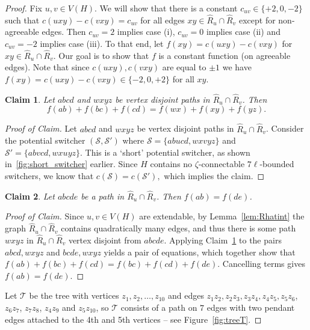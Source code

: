 \documentclass[A4paper,12pt]{article}
\newtheorem{claim}{Claim}[thm]
\theoremstyle{definition}
\newcommand*{\claimproofname}{Proof of Claim}
\newenvironment{claimproof}[1][\claimproofname]{\begin{proof}[#1]\renewcommand*{\qedsymbol}{\(\square\)}}{\end{proof}}
\begin{document}
\begin{proof}
    Fix $u,v \in V(H)$. We will show that there is a constant $c_{uv} \in \{+2,0,-2\}$  such that  $c(uxy) - c(vxy) = c_{uv}$ for all edges $xy\in\hat{R}_u \cap \hat{R}_v$ except for non-agreeable edges. Then $c_{uv} = 2$ implies case (i), $c_{uv} = 0$ implies case (ii) and $c_{uv} = -2$ implies case (iii). To that end, let $f(xy) = c(uxy) - c(vxy)$ for $xy \in \hat{R}_u \cap \hat{R}_v$. Our goal is to show that $f$ is a constant function (on agreeable edges).
    Note that since $c(uxy), c(vxy)$ are equal to $\pm 1$ we have  $f(xy) = c(uxy) - c(vxy) \in \{-2, 0, +2\}$ for all $xy$. 
    \begin{claim}
    \label{claim:disjpath}
    Let $abcd$ and $wxyz$ be vertex disjoint paths in $\hat{R}_u\cap \hat{R}_v$. Then
    $$
             f(ab) + f(bc) + f(cd) = f(wx) + f(xy) + f(yz).
    $$
    \end{claim}
    \begin{claimproof}
    Let $abcd$ and $wxyz$ be vertex disjoint paths in $\hat{R}_u\cap \hat{R}_v$. 
    Consider the potential switcher $(\mathcal{S},\mathcal{S}')$ where $\mathcal{S} = \{abucd, wxvyz\}$ and $\mathcal{S}' = \{abvcd, wxuyz\}$.
    This is a `short' potential switcher, as shown in~\cref{fig:short_switcher} earlier.
     Since $H$ contains no $\zeta$-connectable $7\ell$-bounded switchers, we know that
     $c(\mathcal{S}) = c(\mathcal{S}'),$ which implies the claim.
     \end{claimproof}
         \begin{claim}
    \label{claim:path5}
    Let $abcde$ be a path in $\hat{R}_u\cap \hat{R}_v$. Then $f(ab)  = f(de)$.
    \end{claim}
\begin{claimproof}
Since $u,v\in V(H)$ are extendable, by Lemma~\ref{lem:Rhatint} the graph $\hat{R}_u \cap \hat{R}_v$ contains quadratically many edges, and thus there is some path $wxyz$ in $\hat{R}_u\cap \hat{R}_v$ vertex disjoint from $abcde$. Applying Claim~\ref{claim:disjpath} to the pairs $abcd, wxyz$ and $bcde,wxyz$ yields a pair of equations, which together show that $f(ab) + f(bc) + f(cd) = f(bc) + f(cd)+ f(de)$. Cancelling terms gives $f(ab) = f(de)$. 
\end{claimproof}



    Let $\mathcal{T}$ be the tree with vertices $z_1,z_2,\ldots, z_{10}$ and edges $z_1z_2, z_2z_3, z_3z_4,z_4z_5,z_5z_6$, $z_6z_7$, $z_7z_8$, $z_4z_9$ and $z_5z_{10}$, so $\mathcal{T}$ consists of a path on $7$ edges with two pendant edges attached to the 4th and 5th vertices -- see Figure~\ref{fig:treeT}.


\end{proof}
\end{document}

